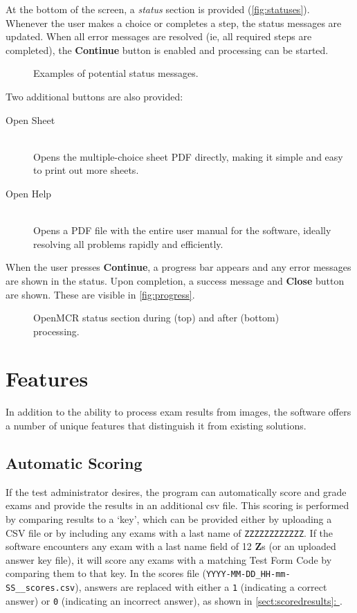 \documentclass[12pt, letterpaper]{report}
\newcommand*{\sectref}[1]{\hypersetup{linkcolor=usfgreen}\hyperref[{#1}]{\ref*{#1}: \nameref*{#1}}}
\newcommand*{\itemref}[1]{\hypersetup{linkcolor=usfgreen}\hyperref[{#1}]{\autoref*{#1}}}
\newcommand*{\boxedimage}[1]{\fbox{\texttt{[image: img/\#1]}}}
\newcommand{\fig}[3]{
  \begin{figure}[h]
    \caption{#1}
    \label{#3}
    \centering
    \boxedimage{#2}
  \end{figure}
}
\newcommand*{\descitem}[1]{\item[#1] \hfill \\ }
\begin{document}
At the bottom of the screen, a \textit{status} section is provided (\itemref{fig:statuses}). Whenever the
user makes a choice or completes a step, the status messages are updated. When
all error messages are resolved (ie, all required steps are completed), the
\textbf{Continue} button is enabled and processing can be started.

\fig{Examples of potential status messages.}{statuses.png}{fig:statuses}

Two additional buttons are also provided:
\begin{description}
  \descitem{Open Sheet} Opens the multiple-choice sheet PDF directly, making it
  simple and easy to print out more sheets.
  \descitem{Open Help} Opens a PDF file with the entire user manual for the
  software, ideally resolving all problems rapidly and efficiently.
\end{description}

When the user presses \textbf{Continue}, a progress bar appears and any error
messages are shown in the status. Upon completion, a success message and \textbf{Close}
button are shown. These are visible in \itemref{fig:progress}.

\fig{OpenMCR status section during (top) and after (bottom) processing.}{progress.png}{fig:progress}

\section{Features}
In addition to the ability to process exam results from images, the software
offers a number of unique features that distinguish it from existing solutions.

\subsection{Automatic Scoring}
\label{sect:scoring}
If the test administrator desires, the program can automatically score and grade
exams and provide the results in an additional \ac{csv} file. This scoring is
performed by comparing results to a `key', which can be provided either by
uploading a CSV file or by including any exams with a last name of
\verb!ZZZZZZZZZZZZ!. If the software encounters any exam with a last name field
of 12 \textbf{Z}s (or an uploaded answer key file), it will score any exams with
a matching Test Form Code by comparing them to that key. In the scores file (\verb!YYYY-MM-DD_HH-mm-SS__scores.csv!),
answers are replaced with either a \verb!1! (indicating a correct answer) or
\verb!0! (indicating an incorrect answer), as shown in \sectref{sect:scoredresults}.
\end{document}

